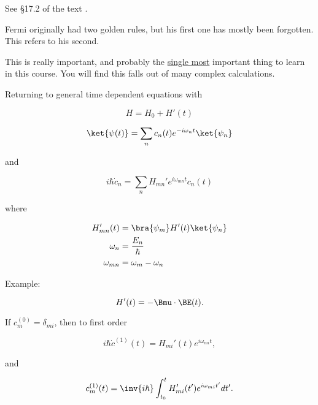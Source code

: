 

See \S 17.2 of the text \cite{desai2009quantum}.

Fermi originally had two golden rules, but his first one has mostly been forgotten.  This refers to his second.

This is really important, and probably the \underline{single most} important thing to learn in this course.  You will find this falls out of many complex calculations.

Returning to general time dependent equations with

\begin{equation}\label{eqn:qmTwoL9:330}
H = H_0 + H'(t)
\end{equation}

\begin{equation}\label{eqn:qmTwoL9:350}
\ket{\psi(t)} = \sum_n c_n(t) e^{-i\omega_n t} \ket{\psi_n}
\end{equation}

and 

\begin{equation}\label{eqn:qmTwoL9:370}
i \hbar \dot{c}_n = \sum_n H_{mn}' e^{i \omega_{mn} t} c_n(t)
\end{equation}

where

\begin{align}\label{eqn:qmTwoL9:390}
H_{mn}'(t) &= \bra{\psi_m} H'(t) \ket{\psi_n} \\
\omega_n &= \frac{E_n}{\hbar} \\
\omega_{mn} &= \omega_m - \omega_n
\end{align}

Example:

\begin{equation}\label{eqn:qmTwoL9:410}
H'(t) = - \Bmu \cdot \BE(t).
\end{equation}

If $c_m^{(0)} = \delta_{mi}$, then to first order

\begin{equation}\label{eqn:qmTwoL9:430}
i \hbar \dot{c}^{(1)}(t) = H_{mi}'(t) e^{i \omega_{mi} t},
\end{equation}

and

\begin{equation}\label{eqn:qmTwoL9:450}
c_m^{(1)}(t) = \inv{i\hbar} \int_{t_0}^t H_{mi}'(t') e^{i \omega_{mi} t'} dt'.
\end{equation}

